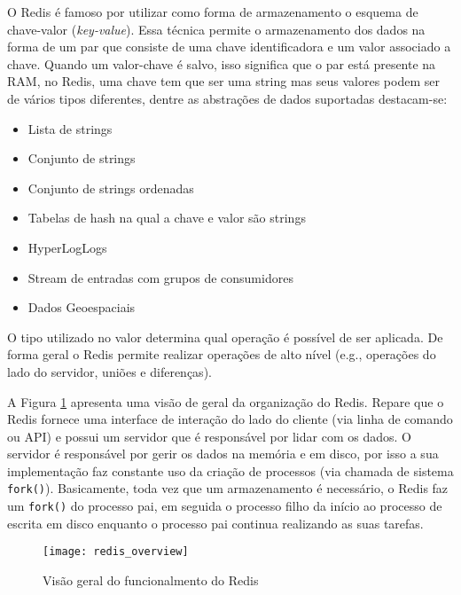 O Redis é famoso por utilizar como forma de armazenamento o esquema de
chave-valor (\textit{key-value}). Essa técnica permite o armazenamento dos dados na
forma de um par que consiste de uma chave identificadora e um valor associado a
chave. Quando um valor-chave é salvo, isso significa que o par está presente na
RAM, no Redis, uma chave tem que ser uma string mas seus valores podem ser de
vários tipos diferentes, dentre as abstrações de dados suportadas destacam-se:

\begin{itemize}
  \item Lista de strings
  \item Conjunto de strings
  \item Conjunto de strings ordenadas
  \item Tabelas de hash na qual a chave e valor são strings
  \item HyperLogLogs
  \item Stream de entradas com grupos de consumidores
  \item Dados Geoespaciais
\end{itemize}

O tipo utilizado no valor determina qual operação é possível de ser aplicada.
De forma geral o Redis permite realizar operações de alto nível (e.g.,
operações do lado do servidor, uniões e diferenças).

A Figura \ref{fig:redis} apresenta uma visão de geral da organização do Redis.
Repare que o Redis fornece uma interface de interação do lado do cliente (via
linha de comando ou API) e possui um servidor que é responsável por lidar com
os dados.  O servidor é responsável por gerir os dados na memória e em disco,
por isso a sua implementação faz constante uso da criação de processos (via
chamada de sistema \texttt{fork()}). Basicamente, toda vez que um armazenamento
é necessário, o Redis faz um \texttt{fork()} do processo pai, em seguida o
processo filho da início ao processo de escrita em disco enquanto o processo
pai continua realizando as suas tarefas. 

\begin{figure}[!h]
  \centering
  \texttt{[image: redis\_overview]}
  \caption{Visão geral do funcionalmento do Redis}
  \label{fig:redis}
\end{figure}

